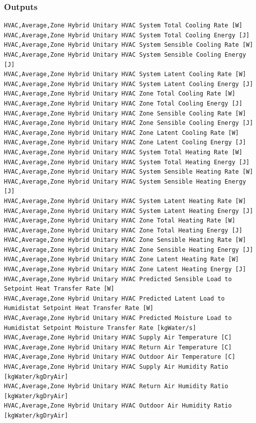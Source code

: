 \subsubsection{Outputs}
{\tiny
\begin{lstlisting}
HVAC,Average,Zone Hybrid Unitary HVAC System Total Cooling Rate [W]
HVAC,Average,Zone Hybrid Unitary HVAC System Total Cooling Energy [J]
HVAC,Average,Zone Hybrid Unitary HVAC System Sensible Cooling Rate [W]
HVAC,Average,Zone Hybrid Unitary HVAC System Sensible Cooling Energy [J]
HVAC,Average,Zone Hybrid Unitary HVAC System Latent Cooling Rate [W]
HVAC,Average,Zone Hybrid Unitary HVAC System Latent Cooling Energy [J]
HVAC,Average,Zone Hybrid Unitary HVAC Zone Total Cooling Rate [W]
HVAC,Average,Zone Hybrid Unitary HVAC Zone Total Cooling Energy [J]
HVAC,Average,Zone Hybrid Unitary HVAC Zone Sensible Cooling Rate [W]
HVAC,Average,Zone Hybrid Unitary HVAC Zone Sensible Cooling Energy [J]
HVAC,Average,Zone Hybrid Unitary HVAC Zone Latent Cooling Rate [W]
HVAC,Average,Zone Hybrid Unitary HVAC Zone Latent Cooling Energy [J]
HVAC,Average,Zone Hybrid Unitary HVAC System Total Heating Rate [W]
HVAC,Average,Zone Hybrid Unitary HVAC System Total Heating Energy [J]
HVAC,Average,Zone Hybrid Unitary HVAC System Sensible Heating Rate [W]
HVAC,Average,Zone Hybrid Unitary HVAC System Sensible Heating Energy [J]
HVAC,Average,Zone Hybrid Unitary HVAC System Latent Heating Rate [W]
HVAC,Average,Zone Hybrid Unitary HVAC System Latent Heating Energy [J]
HVAC,Average,Zone Hybrid Unitary HVAC Zone Total Heating Rate [W]
HVAC,Average,Zone Hybrid Unitary HVAC Zone Total Heating Energy [J]
HVAC,Average,Zone Hybrid Unitary HVAC Zone Sensible Heating Rate [W]
HVAC,Average,Zone Hybrid Unitary HVAC Zone Sensible Heating Energy [J]
HVAC,Average,Zone Hybrid Unitary HVAC Zone Latent Heating Rate [W]
HVAC,Average,Zone Hybrid Unitary HVAC Zone Latent Heating Energy [J]
HVAC,Average,Zone Hybrid Unitary HVAC Predicted Sensible Load to Setpoint Heat Transfer Rate [W]
HVAC,Average,Zone Hybrid Unitary HVAC Predicted Latent Load to Humidistat Setpoint Heat Transfer Rate [W]
HVAC,Average,Zone Hybrid Unitary HVAC Predicted Moisture Load to Humidistat Setpoint Moisture Transfer Rate [kgWater/s]
HVAC,Average,Zone Hybrid Unitary HVAC Supply Air Temperature [C]
HVAC,Average,Zone Hybrid Unitary HVAC Return Air Temperature [C]
HVAC,Average,Zone Hybrid Unitary HVAC Outdoor Air Temperature [C]
HVAC,Average,Zone Hybrid Unitary HVAC Supply Air Humidity Ratio [kgWater/kgDryAir]
HVAC,Average,Zone Hybrid Unitary HVAC Return Air Humidity Ratio [kgWater/kgDryAir]
HVAC,Average,Zone Hybrid Unitary HVAC Outdoor Air Humidity Ratio [kgWater/kgDryAir]

\end{lstlisting}}
